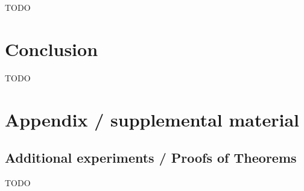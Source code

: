 \documentclass{article}
\begin{document}
TODO

\section{Conclusion}\label{sec:concl}

TODO







\newpage
\appendix
\section{Appendix / supplemental material}\label{app}

\subsection{Additional experiments / Proofs of Theorems}\label{app:exp}

TODO
\end{document}
